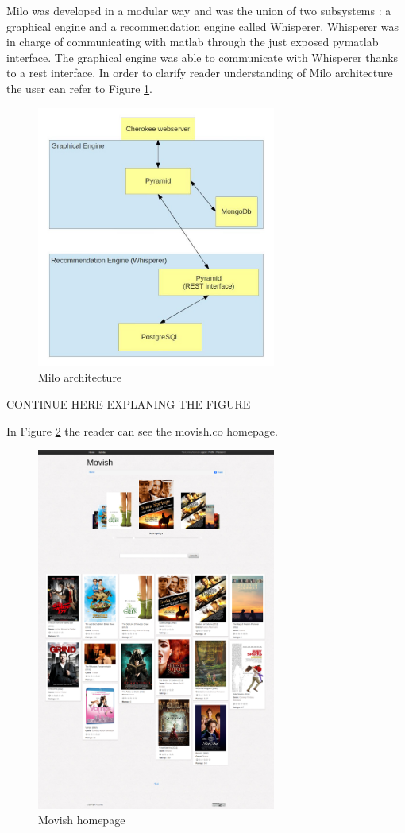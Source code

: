 Milo was developed in a modular way and was the union of two subsystems \cite{thesis-andreia}: a graphical engine and a recommendation engine called Whisperer. Whisperer was in charge of communicating with matlab through the just exposed pymatlab interface. The graphical engine was able to communicate with Whisperer thanks to a rest interface. In order to clarify reader understanding of Milo architecture the user can refer to Figure \ref{fig:milo_architecture}.

\begin{figure}
  \centering
  \includegraphics[width=0.7\textwidth]{figures/milo_architecture.jpg}
  \caption{Milo architecture}
  \label{fig:milo_architecture}
\end{figure}

CONTINUE HERE EXPLANING THE FIGURE


In Figure \ref{fig:movish_homepage} the reader can see the movish.co homepage. 

\begin{figure}
  \centering
  \includegraphics[width=0.7\textwidth]{figures/movish-homepage.png}
  \caption{Movish homepage}
  \label{fig:movish_homepage}
\end{figure}


\acresetall